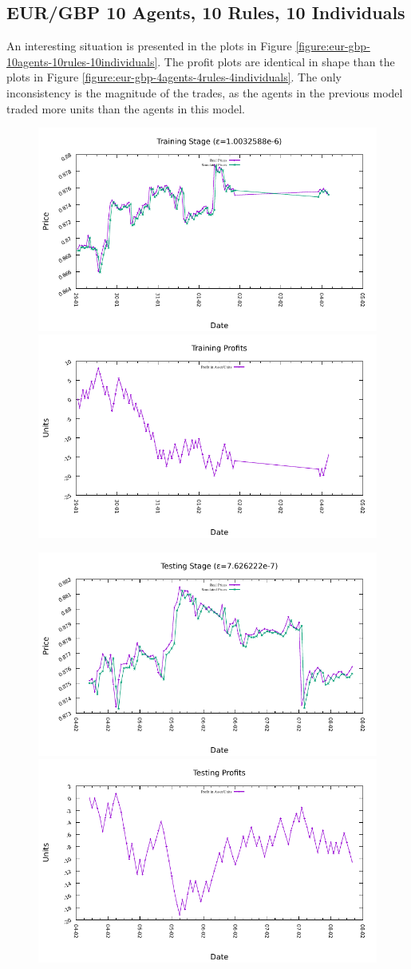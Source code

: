 \newpage

\subsection{EUR/GBP 10 Agents, 10 Rules, 10 Individuals}
\label{results:forecast-eur-gbp-10agents-10rules-10individuals}

An interesting situation is presented in the plots in Figure \ref{figure:eur-gbp-10agents-10rules-10individuals}. The profit plots are identical in shape than the plots in Figure \ref{figure:eur-gbp-4agents-4rules-4individuals}. The only inconsistency is the magnitude of the trades, as the agents in the previous model traded more units than the agents in this model.

\begin{figure}[htp]
  \centering

  \includegraphics[width=.45\textwidth]{img/plots/eur_gbp_h1-10agents-10rules-10ind-100gen_training_fit.pdf}\quad
  \includegraphics[width=.45\textwidth]{img/plots/eur_gbp_h1-10agents-10rules-10ind-100gen_training_profits.pdf}

  \medskip

  \includegraphics[width=.45\textwidth]{img/plots/eur_gbp_h1-10agents-10rules-10ind-100gen_testing_fit.pdf}\quad
  \includegraphics[width=.45\textwidth]{img/plots/eur_gbp_h1-10agents-10rules-10ind-100gen_testing_profits.pdf}


\end{figure}
